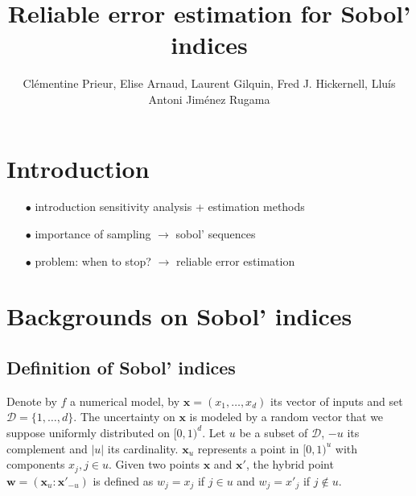 \documentclass[]{elsarticle}
\theoremstyle{definition}
\newcommand{\cube}{[0,1)^d}
\newcommand{\bvec}[1]{\boldsymbol{#1}}
\newcommand{\vx}{\bvec{x}}
\newcommand{\vw}{\bvec{w}}
\begin{document}
\begin{frontmatter}

\title{Reliable error estimation for Sobol' indices}

\author{Cl\'ementine Prieur, Elise Arnaud, Laurent Gilquin, Fred J. Hickernell, Llu\'{i}s Antoni Jim\'{e}nez Rugama}
\address{U. Josef Fourier, Illinois Institute of Technology}
\begin{abstract}
\end{abstract}

\end{frontmatter}

\section{Introduction}

\begin{itemize}
\item[$\bullet$] introduction sensitivity analysis + estimation methods
\item[$\bullet$] importance of sampling $\rightarrow$ sobol' sequences
\item[$\bullet$] problem: when to stop? $\rightarrow$ reliable error estimation 
\end{itemize}

\section{Backgrounds on Sobol' indices}

\subsection{Definition of Sobol' indices}
Denote by $f$ a numerical model, by $\vx=(x_1,\dots,x_d)$ its vector of inputs and set $\mathcal{D}=\{1,\dots,d\}$. The uncertainty on $\vx$ is modeled by a random vector that we suppose uniformly distributed on $\cube$. Let $u$ be a subset of $\mathcal{D}$, $-u$ its complement and $|u|$ its cardinality. $\vx_u$ represents a point in $[0,1)^u$ with components $x_j, j \in u$. Given two points $\vx$ and $\vx'$, the hybrid point $\vw=(\vx_u:{\vx'}_{-u})$ is defined as $w_j=x_j$ if $j \in u$ and $w_j={x'}_j$ if $j \notin u$.
\end{document}
